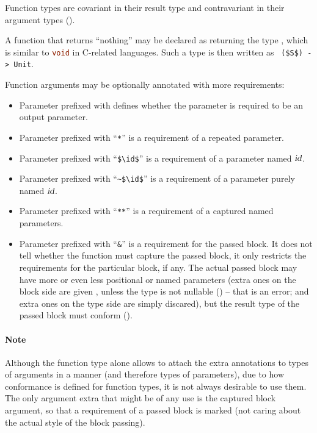 Function types are covariant in their result type and contravariant in their argument types ().

A function that returns ``nothing'' may be declared as returning the type , which is similar to \lstinline[language=C]!void! in C-related languages. Such a type is then written as ~\lstinline!($S$) -> Unit!. 

Function arguments may be optionally annotated with more requirements: 
\begin{itemize}
\item
Parameter prefixed with  defines whether the parameter is required to be an output parameter. 

\item
Parameter prefixed with ``\lstinline!*!'' is a requirement of a repeated parameter. 

\item 
Parameter prefixed with ``\lstinline!$\id$!'' is a requirement of a parameter named $\mbox{\sl id}$.

\item 
Parameter prefixed with ``\lstinline!~$\id$!'' is a requirement of a parameter purely named $\mbox{\sl id}$.

\item 
Parameter prefixed with ``\lstinline!**!'' is a requirement of a captured named parameters. 

\item
Parameter prefixed with ``\lstinline!&!'' is a requirement for the passed block. It does not tell whether the function must capture the passed block, it only restricts the requirements for the particular block, if any. The actual passed block may have more or even less positional or named parameters (extra ones on the block side are given , unless the type is not nullable () -- that is an error; and extra ones on the type side are simply discared), but the result type of the passed block must conform ().
\end{itemize}

\paragraph{Note}
Although the function type alone allows to attach the extra annotations to types of arguments in a  manner (and therefore types of parameters), due to how conformance is defined for function types, it is not always desirable to use them. The only argument extra that might be of any use is the captured block argument, so that a requirement of a passed block is marked (not caring about the actual style of the block passing). 

